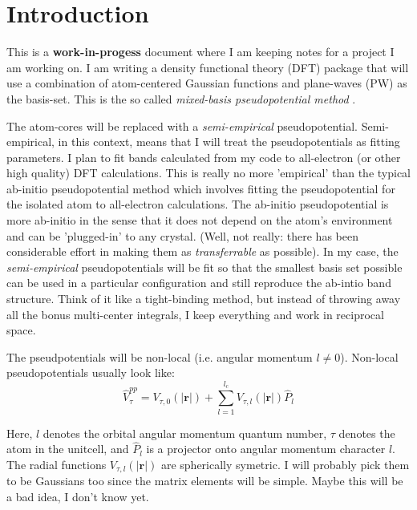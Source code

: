 \documentclass[prb,aps,11pt,superscriptaddress,floatfix]{revtex4-2}
\begin{document}
\maketitle

\tableofcontents


\section{Introduction}

This is a \textbf{work-in-progess} document where I am keeping notes for a project I am working on. I am writing a density functional theory (DFT) package that will use a combination of atom-centered Gaussian functions and plane-waves (PW) as the basis-set. This is the so called \emph{mixed-basis pseudopotential method} \cite{louie1979self}. 

The atom-cores will be replaced with a \emph{semi-empirical} pseudopotential. Semi-empirical, in this context, means that I will treat the pseudopotentials as fitting parameters. I plan to fit bands calculated from my code to all-electron (or other high quality) DFT calculations. This is really no more 'empirical' than the typical ab-initio pseudopotential method which involves fitting the pseudopotential for the isolated atom to all-electron calculations. The ab-initio pseudopotential is more ab-initio in the sense that it does not depend on the atom's environment and can be 'plugged-in' to any crystal. (Well, not really: there has been considerable effort in making them as \emph{transferrable} as possible). In my case, the \emph{semi-empirical} pseudopotentials will be fit so that the smallest basis set possible can be used in a particular configuration and still reproduce the ab-intio band structure. Think of it like a tight-binding method, but instead of throwing away all the bonus multi-center integrals, I keep everything and work in reciprocal space. 

The pseudpotentials will be non-local (i.e. angular momentum $l \neq 0$). Non-local pseudopotentials usually look like:
\begin{equation}
	\hat{V}^{pp}_{\tau} = V_{\tau,0}(|\pmb{r}|)+\sum_{l=1}^{l_c} V_{\tau,l}(|\pmb{r}|) \hat{P}_l
\end{equation}

Here, $l$ denotes the orbital angular momentum quantum number, $\tau$ denotes the atom in the unitcell, and $\hat{P}_l$ is a projector onto angular momentum character $l$. The radial functions $V_{\tau,l}(|\pmb{r}|)$ are spherically symetric. I will probably pick them to be Gaussians too since the matrix elements will be simple. Maybe this will be a bad idea, I don't know yet. 




\end{document}
